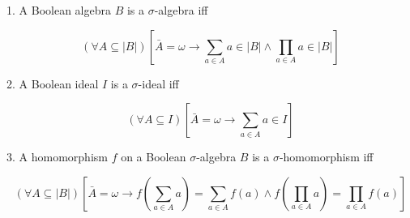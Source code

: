 1. A Boolean algebra $B$ is a $\sigma$-algebra iff

$$(\forall A \subseteq |B|) \left[ \bar{A} = \omega \rightarrow \sum_{a \in A} a \in |B| \land \prod_{a \in A} a \in |B| \right]$$

2. A Boolean ideal $I$ is a $\sigma$-ideal iff

$$(\forall A \subseteq I) \left[ \bar{A} = \omega \rightarrow \sum_{a \in A} a \in I \right]$$

3. A homomorphism $f$ on a Boolean $\sigma$-algebra $B$ is a $\sigma$-homomorphism iff

$$(\forall A \subseteq |B|) \left[ \bar{A} = \omega \rightarrow f\left(\sum_{a \in A} a\right) = \sum_{a \in A} f(a) \land f\left(\prod_{a \in A} a\right) = \prod_{a \in A} f(a) \right]$$
